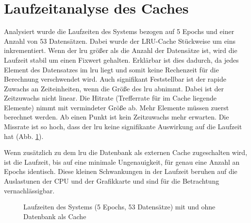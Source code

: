 \section{Laufzeitanalyse des Caches}\label{analyze}
Analysiert wurde die Laufzeiten des Systems bezogen auf 5 Epochs und einer Anzahl von 53 Datensätzen. Dabei wurde der LRU-Cache Stückweise um eins inkrementiert. Wenn der \ac{lru} größer als die Anzahl der Datensätze ist, wird die Laufzeit stabil um einen Fixwert gehalten. Erklärbar ist dies dadurch, da jedes Element des Datensatzes im \ac{lru} liegt und somit keine Rechenzeit für die Berechnung verschwendet wird. Auch signifikant Feststellbar ist der rapide Zuwachs an Zeiteinheiten, wenn die Größe des \ac{lru} abnimmt. Dabei ist der Zeitzuwachs nicht linear. Die Hitrate (Trefferrate für im Cache liegende Elemente) nimmt mit vermindeter Größe ab. Mehr Elemente müssen zuerst berechnet werden. Ab einen Punkt ist kein Zeitzuwachs mehr erwarten. Die Missrate ist so hoch, dass der \ac{lru} keine signifikante Auswirkung auf die Laufzeit hat (Abb. \ref{cap:analyze}).

Wenn zusätzlich zu dem \ac{lru} die Datenbank als externen Cache zugeschalten wird, ist die Laufzeit, bis auf eine minimale Ungenauigkeit, für genau eine Anzahl an Epochs identisch. Diese kleinen  Schwankungen in der Laufzeit beruhen auf die Auslastunen der CPU und der Grafikkarte und sind für die Betrachtung vernachlässigbar.

\begin{figure}[!htb]
\begin{center}
\caption[Laufzeiten des Systems mit und ohne Datenbank als Cache]{Laufzeiten des Systems (5 Epochs, 53 Datensätze) mit und ohne Datenbank als Cache}\label{cap:analyze}
\end{center}
\end{figure}\label{fig:analyze}
